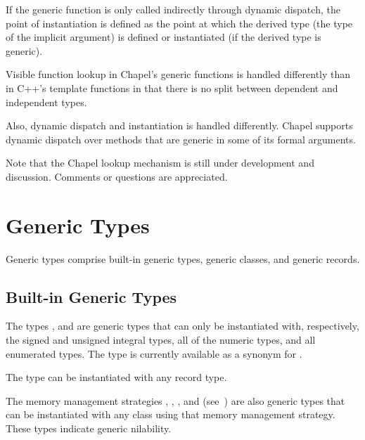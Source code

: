 If the generic function is only called indirectly through dynamic
dispatch, the point of instantiation is defined as the point at which
the derived type (the type of the implicit  argument) is
defined or instantiated (if the derived type is generic).

\begin{rationale}
Visible function lookup in Chapel's generic functions is handled
differently than in C++'s template functions in that there is no split
between dependent and independent types.

Also, dynamic dispatch and instantiation is handled differently.
Chapel supports dynamic dispatch over methods that are generic in some
of its formal arguments.

Note that the Chapel lookup mechanism is still under development and
discussion.  Comments or questions are appreciated.
\end{rationale}

\section{Generic Types}
\label{Generic_Types}

Generic types comprise built-in generic types, generic classes, and
generic records.

\subsection{Built-in Generic Types}
\label{Built_in_Generic_types}

The types ,  and 
are generic types that can only be instantiated with, respectively, the
signed and unsigned integral types, all of the numeric types, and
all enumerated types. The type  is currently available
as a synonym for .

The type  can be instantiated with any record type.

The memory management strategies , ,
, and  (see~)
are also generic types that can be instantiated with any class
using that memory management strategy. These types indicate
generic nilability.

